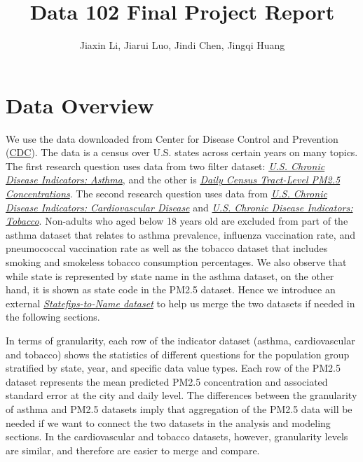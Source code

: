 \documentclass{article}
\title{Data 102 Final Project Report}
\author{Jiaxin Li, Jiarui Luo, Jindi Chen, Jingqi Huang}
\date{\displaydate{December 13, 2021}}
\begin{document}
\maketitle


\setlength{\parindent}{0cm}
\section{Data Overview}

We use the data downloaded from Center for Disease Control and Prevention (\href{https://chronicdata.cdc.gov/Chronic-Disease-Inicators/U-S-Chronic-Disease-Indicators-CDI-/g4ie-h725}{CDC}). The data is a census over U.S. states across certain years on many topics. The first research question uses data from two filter dataset: \href{https://chronicdata.cdc.gov/Chronic-Disease-Indicators/U-S-Chronic-Disease-Indicators-Asthma/us8e-ubyj}{\textit{U.S. Chronic Disease Indicators: Asthma}}, and the other is \href{https://data.cdc.gov/Environmental-Health-Toxicology/Daily-Census-Tract-Level-PM2-5-Concentrations-2011/fcqm-xrf4}{\textit{Daily Census Tract-Level PM2.5 Concentrations}}. The second research question uses data from \href{https://chronicdata.cdc.gov/Chronic-Disease-Indicators/U-S-Chronic-Disease-Indicators-Cardiovascular-Dise/232j-jiq5}{\textit{U.S. Chronic Disease Indicators: Cardiovascular Disease}} and \href{https://chronicdata.cdc.gov/Chronic-Disease-Indicators/U-S-Chronic-Disease-Indicators-Tobacco/rrbt-bhen}{\textit{U.S. Chronic Disease Indicators: Tobacco}}. Non-adults who aged below 18 years old are excluded from part of the asthma dataset that relates to asthma prevalence, influenza vaccination rate, and pneumococcal vaccination rate as well as the tobacco dataset that includes smoking and smokeless tobacco consumption percentages. We also observe that while state is represented by state name in the asthma dataset, on the other hand, it is shown as state code in the PM2.5 dataset. Hence we introduce an external \href{https://www.census.gov/library/reference/code-lists/ansi/ansi-codes-for-states.html}{\textit{Statefips-to-Name dataset}} to help us merge the two datasets if needed in the following sections.

In terms of granularity, each row of the indicator dataset (asthma, cardiovascular and tobacco) shows the statistics of different questions for the population group stratified by state, year, and specific data value types. Each row of the PM2.5 dataset represents the mean predicted PM2.5 concentration and associated standard error at the city and daily level. The differences between the granularity of asthma and PM2.5 datasets imply that aggregation of the PM2.5 data will be needed if we want to connect the two datasets in the analysis and modeling sections. In the cardiovascular and tobacco datasets, however, granularity levels are similar, and therefore are easier to merge and compare. 
\end{document}
